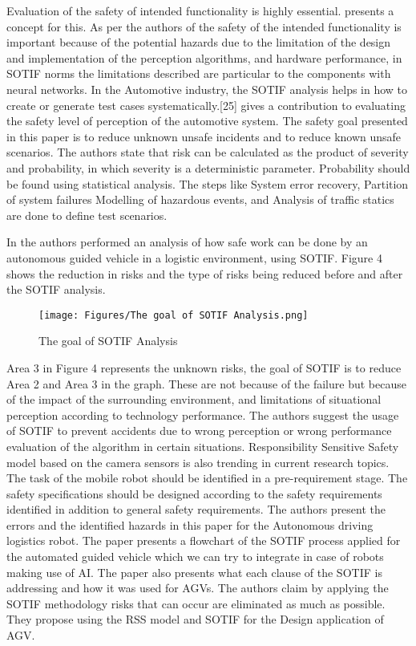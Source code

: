 {Evaluation of the safety of intended functionality is highly essential.\cite{author25} presents a concept for this. As per the authors of \cite{author25} the safety of the intended functionality is important because of the potential hazards due to the limitation of the design and implementation of the perception algorithms, and hardware performance, in SOTIF norms the limitations described are particular to the components with neural networks. In the Automotive industry, the SOTIF analysis helps in how to create or generate test cases systematically.[25] gives a contribution to evaluating the safety level of perception of the automotive system. The safety goal presented in this paper is to reduce unknown unsafe incidents and to reduce known unsafe scenarios. The authors state that risk can be calculated as the product of severity and probability, in which severity is a deterministic parameter. Probability should be found using statistical analysis. The steps like System error recovery, Partition of system failures Modelling of hazardous events, and Analysis of traffic statics are done to define test scenarios.

In \cite{author26}the authors performed an analysis of how safe work can be done by an autonomous guided vehicle in a logistic environment, using SOTIF. Figure  4 shows the reduction in risks and the type of risks being reduced before and after the SOTIF analysis.

\begin{figure}
    \centering
    \texttt{[image: Figures/The goal of SOTIF Analysis.png]}
    \caption{The goal of SOTIF Analysis \cite{author26}}
    \label{fig:enter-label}
\end{figure}

Area 3 in Figure 4 represents the unknown risks, the goal of SOTIF is to reduce Area 2 and Area 3 in the graph. These are not because of the failure but because of the impact of the surrounding environment, and limitations of situational perception according to technology performance. The authors suggest the usage of SOTIF to prevent accidents due to wrong perception or wrong performance evaluation of the algorithm in certain situations. Responsibility Sensitive Safety model based on the camera sensors is also trending in current research topics. The task of the mobile robot should be identified in a pre-requirement stage. The safety specifications should be designed according to the safety requirements identified in addition to general safety requirements. The authors present the errors and the identified hazards in this paper for the Autonomous driving logistics robot. The paper presents a flowchart of the SOTIF process applied for the automated guided vehicle which we can try to integrate in case of robots making use of AI. The paper also presents what each clause of the SOTIF is addressing and how it was used for AGVs. The authors claim by applying the SOTIF methodology risks that can occur are eliminated as much as possible. They propose using the RSS model and SOTIF for the Design application of AGV.

}
